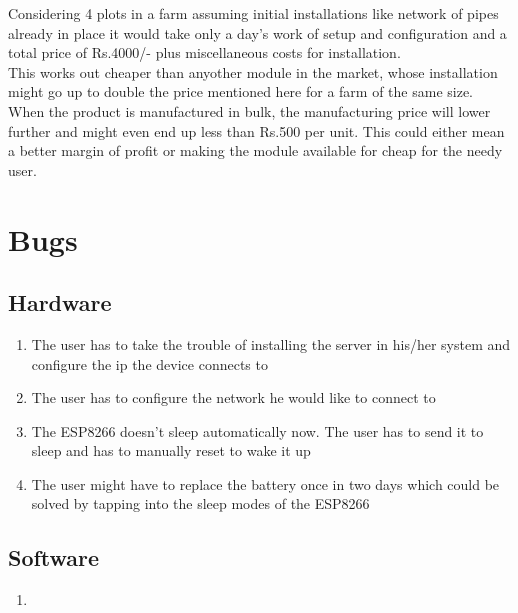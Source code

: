 \documentclass[16pt]{article}
\begin{document}
Considering 4 plots in a farm assuming initial installations like network of pipes already in place it would take only a day's work of setup and configuration 
and a total price of Rs.4000/- plus miscellaneous costs for installation.\\

This works out cheaper than anyother module in the market, whose installation might go up to double the price mentioned here for a farm of the same size.
When the product is manufactured in bulk, the manufacturing price will lower further and might even end up less than Rs.500 per unit. This could
either mean a better margin of profit or making the module available for cheap for the needy user.  


\vspace{15cm}
\section{Bugs}

\vspace{0.5cm}

\subsection{Hardware}
\begin{enumerate}
 \item The user has to take the trouble of installing the server in his/her system and configure the ip the device connects to
 \item The user has to configure the network he would like to connect to 
 \item The ESP8266 doesn't sleep automatically now. The user has to send it to sleep and has to manually reset to wake it up
 \item The user might have to replace the battery once in two days which could be solved by tapping into the sleep modes of the ESP8266
\end{enumerate}

\vspace{0.5cm}

\subsection{Software}
\begin{enumerate}
 \item 
\end{enumerate}


\vspace{19cm}
\end{document}
